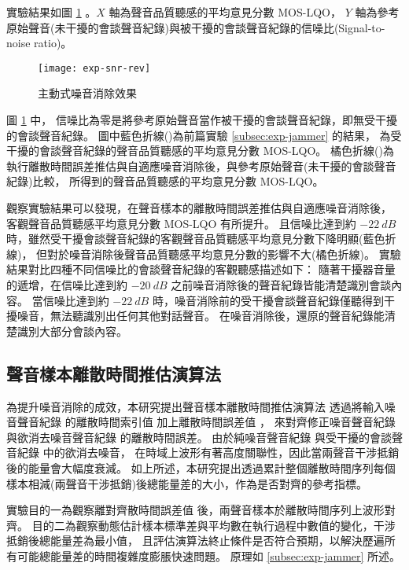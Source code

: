     實驗結果如圖 \ref{fig:exp-snr-rev} 。$X$ 軸為聲音品質聽感的平均意見分數 MOS-LQO，
$Y$ 軸為參考原始聲音(未干擾的會談聲音紀錄)與被干擾的會談聲音紀錄的信噪比(Signal-to-noise ratio)。

\begin{figure}[H]
    \centering
    \texttt{[image: exp-snr-rev]}
    \caption{主動式噪音消除效果}\label{fig:exp-snr-rev}
\end{figure}

    圖 \ref{fig:exp-snr-rev} 中，
信噪比為零是將參考原始聲音當作被干擾的會談聲音紀錄，即無受干擾的會談聲音紀錄。
圖中藍色折線(\DEFrecJ)為前篇實驗 \ref{subsec:exp-jammer}  的結果，
為受干擾的會談聲音紀錄的聲音品質聽感的平均意見分數 MOS-LQO。
橘色折線(\DEFrecREV)為執行離散時間誤差推估與自適應噪音消除後，與參考原始聲音(未干擾的會談聲音紀錄)比較，
所得到的聲音品質聽感的平均意見分數 MOS-LQO。

    觀察實驗結果可以發現，在聲音樣本的離散時間誤差推估與自適應噪音消除後，
客觀聲音品質聽感平均意見分數 MOS-LQO 有所提升。
且信噪比達到約 $-22~dB$ 時，雖然受干擾會談聲音紀錄的客觀聲音品質聽感平均意見分數下降明顯(藍色折線\DEFrecJ)，
但對於噪音消除後聲音品質聽感平均意見分數的影響不大(橘色折線\DEFrecREV)。
實驗結果對比四種不同信噪比的會談聲音紀錄的客觀聽感描述如下：
隨著干擾器音量的遞增，在信噪比達到約 $-20~dB$ 之前噪音消除後的聲音紀錄皆能清楚識別會談內容。
當信噪比達到約 $-22~dB$ 時，噪音消除前的受干擾會談聲音紀錄僅聽得到干擾噪音，無法聽識別出任何其他對話聲音。
在噪音消除後，還原的聲音紀錄能清楚識別大部分會談內容。


\subsection{聲音樣本離散時間推估演算法}\label{subsec:exp-estm}

    為提升噪音消除的成效，本研究提出聲音樣本離散時間推估演算法
透過將輸入噪音聲音紀錄 \DEFrecN 的離散時間索引值 \DEFpause 加上離散時間誤差值 \DEFshift，
來對齊修正噪音聲音紀錄 \DEFrecN 與欲消去噪音聲音紀錄 \DEFrecJ 的離散時間誤差。
由於純噪音聲音紀錄 \DEFrecN 與受干擾的會談聲音紀錄 \DEFrecJ 中的欲消去噪音，
在時域上波形有著高度關聯性，因此當兩聲音干涉抵銷後的能量會大幅度衰減。
如上所述，本研究提出透過累計整個離散時間序列每個樣本相減(兩聲音干涉抵銷)後總能量差的大小，作為是否對齊的參考指標。

    實驗目的一為觀察離對齊散時間誤差值 \DEFshift 後，兩聲音樣本於離散時間序列上波形對齊。
目的二為觀察動態估計樣本標準差與平均數在執行過程中數值的變化，干涉抵銷後總能量差為最小值，
且評估演算法終止條件是否符合預期，以解決歷遍所有可能總能量差的時間複雜度膨脹快速問題。
原理如 \ref{subsec:exp-jammer} 所述。

